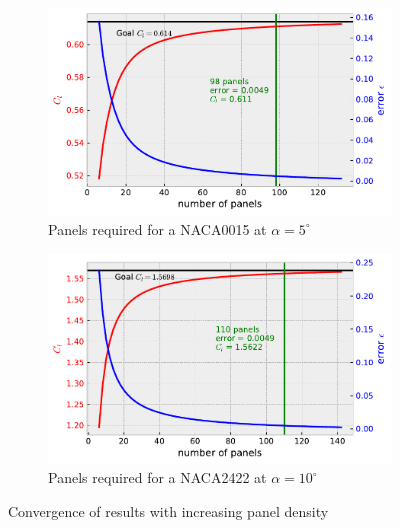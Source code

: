 \begin{figure}[h]
  \centering
  \begin{subfigure}{.5\textwidth}
    \centering
    \captionsetup{width=.8\linewidth}
    \includegraphics[width=.9\linewidth]{static/thin_conv_naca0015.pdf}
    \caption{\centering Panels required for a NACA0015 at $\alpha = 5^{\circ}$}
    \label{fig:thick_panels1}
  \end{subfigure}%
  \begin{subfigure}{.5\textwidth}
    \centering
    \captionsetup{width=.8\linewidth}
    \includegraphics[width=.9\linewidth]{static/thin_conv_naca2422.pdf}
    \caption{\centering Panels required for a NACA2422 at $\alpha = 10^{\circ}$}
    \label{fig:thick_panels2}
  \end{subfigure}
  \caption{\centering Convergence of results with increasing panel density}
  \label{fig:thick_panels}
\end{figure}
